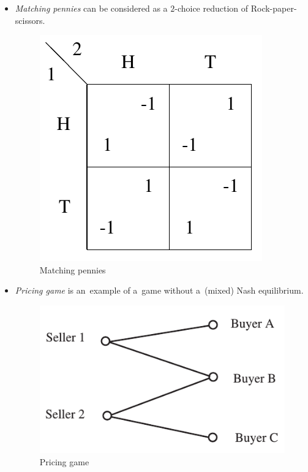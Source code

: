 \begin{itemize}
  \item \emph{Matching pennies} can be considered as a $2$-choice reduction of Rock-paper-scissors.

    \begin{figure}[H]
      \centering
      \includegraphics[width=\widthratio\paperwidth]{../img/matching-pennies.png}
      \caption{Matching pennies}
      \label{fig:matching-pennies}
    \end{figure}

  \item \emph{Pricing game} is an~example of a~game without a~(mixed) Nash equilibrium.

    \begin{figure}[H]
      \centering
      \includegraphics[width=\widthratio\paperwidth]{../img/pricing-game.png}
      \caption{Pricing game}
      \label{fig:pricing-game}
    \end{figure}


\end{itemize}
